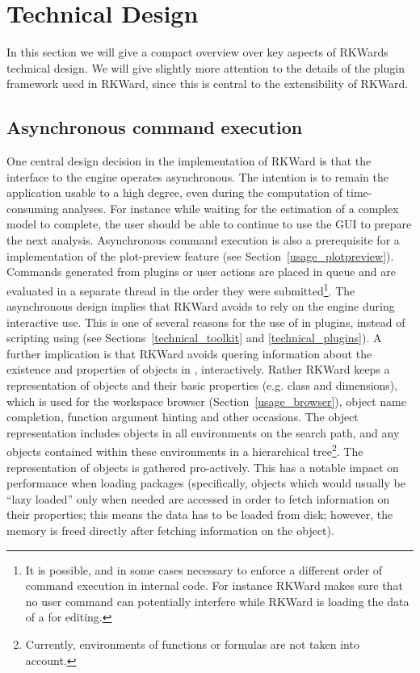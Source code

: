 \section[technical]{Technical Design}
In this section we will give a compact overview over key aspects of RKWards
technical design. We will give slightly more attention to the details of the
plugin framework used in RKWard, since this is central to the extensibility of
RKWard.

\subsection[technical_asynchronous]{Asynchronous command execution}
One central design decision in the implementation of RKWard is that the
interface to the  engine operates asynchronous. The intention is to
remain the application usable to a high degree, even during the computation of
time-consuming analyses. For instance while waiting for the estimation of a
complex model to complete, the user should be able to continue to use the GUI to
prepare the next analysis. Asynchronous command execution is also a prerequisite
for a implementation of the plot-preview feature (see Section~\ref{usage_plotpreview}). Commands
generated from plugins or user actions are placed in queue and are evaluated in
a separate thread in the order they were submitted\footnote{
    It is possible, and in some cases necessary to enforce a different order of command execution in
    internal code. For instance RKWard makes sure that no user command can
    potentially interfere while RKWard is loading the data of a  for
    editing.
}. The asynchronous design implies that RKWard avoids to rely on the
 engine during interactive use. This is one of several reasons for
the use of  in plugins, instead of scripting using
 (see Sections~\ref{technical_toolkit} and \ref{technical_plugins}).
A further implication is that RKWard avoids quering information about the
existence and properties of objects in , interactively. Rather
RKWard keeps a representation of  objects and their basic properties
(e.g. class and dimensions), which is used for the workspace browser (Section~\ref{usage_browser}),
object name completion, function argument hinting and
other occasions. The object representation includes objects in all environments
on the search path, and any objects contained within these environments in a
hierarchical tree\footnote{
    Currently, environments of functions or formulas are not taken into account.
}. The representation of  objects is gathered
pro-actively. This has a notable impact on performance when loading packages
(specifically, objects which would usually be ``lazy loaded'' only when needed \citep[see][]{Ripley2004} are
accessed in order to fetch information on their properties; this means the data
has to be loaded from disk; however, the memory is freed directly after fetching
information on the object).

